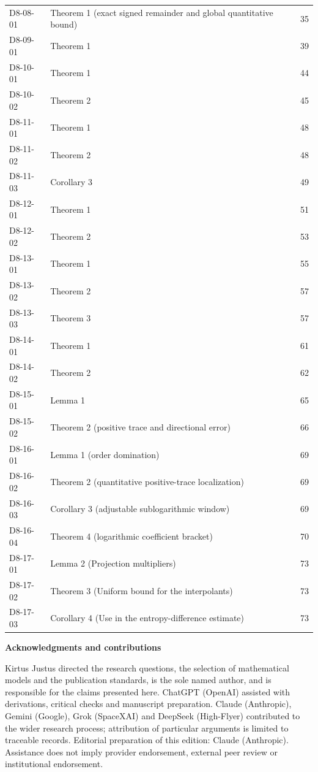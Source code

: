 \documentclass[11pt,a4paper]{article}
\begin{document}
{\begin{longtable}{@{}l>{\raggedright\arraybackslash}p{}r@{}}
D8-08-01 & Theorem 1 (exact signed remainder and global quantitative bound) & 35\\
D8-09-01 & Theorem 1 & 39\\
D8-10-01 & Theorem 1 & 44\\
D8-10-02 & Theorem 2 & 45\\
D8-11-01 & Theorem 1 & 48\\
D8-11-02 & Theorem 2 & 48\\
D8-11-03 & Corollary 3 & 49\\
D8-12-01 & Theorem 1 & 51\\
D8-12-02 & Theorem 2 & 53\\
D8-13-01 & Theorem 1 & 55\\
D8-13-02 & Theorem 2 & 57\\
D8-13-03 & Theorem 3 & 57\\
D8-14-01 & Theorem 1 & 61\\
D8-14-02 & Theorem 2 & 62\\
D8-15-01 & Lemma 1 & 65\\
D8-15-02 & Theorem 2 (positive trace and directional error) & 66\\
D8-16-01 & Lemma 1 (order domination) & 69\\
D8-16-02 & Theorem 2 (quantitative positive-trace localization) & 69\\
D8-16-03 & Corollary 3 (adjustable sublogarithmic window) & 69\\
D8-16-04 & Theorem 4 (logarithmic coefficient bracket) & 70\\
D8-17-01 & Lemma 2 (Projection multipliers) & 73\\
D8-17-02 & Theorem 3 (Uniform bound for the interpolants) & 73\\
D8-17-03 & Corollary 4 (Use in the entropy-difference estimate) & 73\\
\bottomrule\end{longtable}}
\vspace{3mm}\textbf{Acknowledgments and contributions}\par
{\small Kirtus Justus directed the research questions, the selection of mathematical models and the publication standards, is the sole named author, and is responsible for the claims presented here. ChatGPT (OpenAI) assisted with derivations, critical checks and manuscript preparation. Claude (Anthropic), Gemini (Google), Grok (SpaceXAI) and DeepSeek (High-Flyer) contributed to the wider research process; attribution of particular arguments is limited to traceable records. Editorial preparation of this edition: Claude (Anthropic). Assistance does not imply provider endorsement, external peer review or institutional endorsement.\par}
\end{document}
